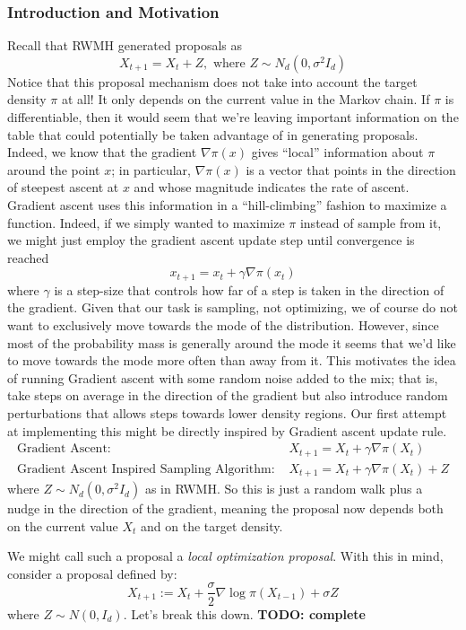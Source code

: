 \documentclass[12pt]{article}
\begin{document}
\subsubsection{Introduction and Motivation}
Recall that RWMH generated proposals as 
\[X_{t + 1} = X_t + Z, \text{ where } Z \sim N_d(0, \sigma^2 I_d)\]
Notice that this proposal mechanism does not take into account the target density $\pi$ at all! It only depends on the current value in the Markov chain. If $\pi$ is differentiable, 
then it would seem that we're leaving important information on the table that could potentially be taken advantage of in generating proposals. Indeed, we know that the gradient
$\nabla \pi(x)$ gives ``local'' information about $\pi$ around the point $x$; in particular, $\nabla \pi(x)$ is a vector that points in the direction of steepest ascent at $x$ and whose 
magnitude indicates the rate of ascent. Gradient ascent uses this information in a ``hill-climbing'' fashion to maximize a function. Indeed, if we simply wanted to maximize $\pi$
instead of sample from it, we might just employ the gradient ascent update step until convergence is reached
\[x_{t + 1} = x_t + \gamma \nabla \pi(x_t)\]
where $\gamma$ is a step-size that controls how far of a step is taken in the direction of the gradient. Given that our task is sampling, not optimizing, we of course do not 
want to exclusively move towards the mode of the distribution. However, since most of the probability mass is generally around the mode it seems that we'd like to move
towards the mode more often than away from it. This motivates the idea of running Gradient ascent with some random noise added to the mix; that is, take steps on average 
in the direction of the gradient but also introduce random perturbations that allows steps towards lower density regions. Our first attempt at implementing this might be directly
inspired by Gradient ascent update rule.
\begin{align*}
\text{Gradient Ascent: } &X_{t + 1} = X_t + \gamma \nabla \pi(X_t) \\
\text{Gradient Ascent Inspired Sampling Algorithm: } &X_{t + 1} = X_t + \gamma \nabla \pi(X_t) + Z
\end{align*}
where $Z \sim N_d(0, \sigma^2 I_d)$ as in RWMH. So this is just a random walk plus a nudge in the direction of the gradient, meaning the proposal now depends both on the current
value $X_t$ and on the target density. 


We might call such a proposal a \textit{local optimization proposal}. With this in mind, consider a proposal defined by: 
\[X_{t + 1} := X_{t} + \frac{\sigma}{2} \nabla \log \pi(X_{t - 1}) + \sigma Z\]
where $Z \sim N(0, I_d)$. Let's break this down. \textbf{TODO: complete}
\end{document}
